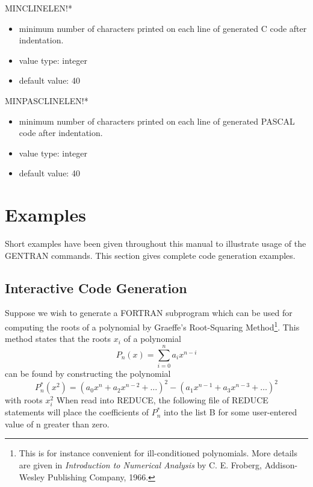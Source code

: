 \begin{describe}{MINCLINELEN!*}
\begin{itemize}
\item minimum number of characters printed on each line of generated C
code after indentation.
\item value type:  integer
\item default value:  40
\end{itemize}
\end{describe}

\begin{describe}{MINPASCLINELEN!*}
\begin{itemize}
\item minimum number of characters printed on each line of generated PASCAL
code after indentation.
\item value type:  integer
\item default value:  40
\end{itemize}
\end{describe}

\section{Examples}\label{GENTRAN:examples}

Short examples have been given throughout this manual to illustrate
usage of the GENTRAN commands.  This section gives complete code
generation examples.

\subsection{Interactive Code Generation} 
Suppose we wish to generate a FORTRAN subprogram which can be used for
computing the roots of a polynomial by Graeffe's Root-Squaring Method\footnote{
This is for instance convenient for ill-conditioned polynomials.  More
details are given in {\it Introduction to Numerical Analysis\/} by
C. E. Froberg, Addison-Wesley Publishing Company, 1966.}. This
method states that the roots $x_i$ of a polynomial
$$P_n(x) = \sum_{i=0}^{n}{a_i x^{n-i}} $$
can be found by constructing the polynomial
$$P^{*}_n\left({x^2}\right) = \left( a_0x^n + a_2x^{n-2} + \dots\right)^2 -
\left( a_1x^{n-1} + a_3x^{n-3} + \dots\right)^2$$
with roots $x_i^2$
When read into REDUCE, the following file of REDUCE statements
will place the coefficients of $P^{*}_n$
into the list B for some user-entered value of n greater than zero.

